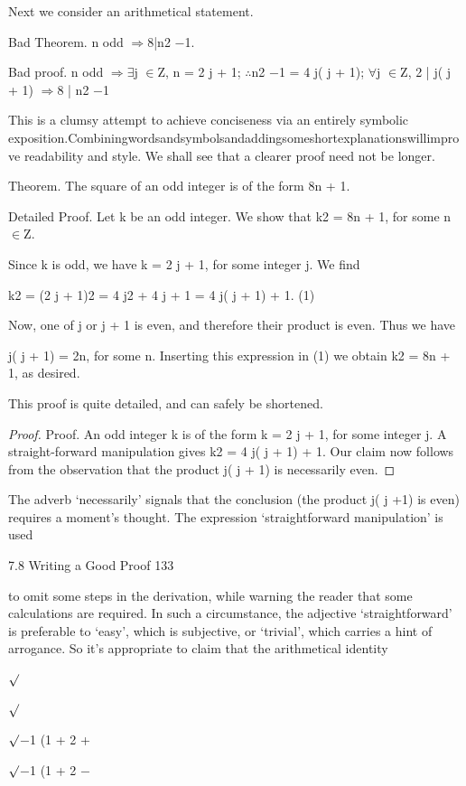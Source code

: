 \documentclass[11pt]{article}
\theoremstyle{plain}
\theoremstyle{definition}
\begin{document}
Next we consider an arithmetical statement.

Bad Theorem. n odd $\Rightarrow$8|n2 $-$1.

Bad proof. n odd $\Rightarrow$$\exists$j $\in$Z, n = 2 j + 1; $\therefore$n2 $-$1 = 4 j( j + 1); $\forall$j $\in$Z, 2 | j( j + 1) $\Rightarrow$8 | n2 $-$1 

This is a clumsy attempt to achieve conciseness via an entirely symbolic exposition.Combiningwordsandsymbolsandaddingsomeshortexplanationswillimprove readability and style. We shall see that a clearer proof need not be longer.

Theorem. The square of an odd integer is of the form 8n + 1.

Detailed Proof. Let k be an odd integer. We show that k2 = 8n + 1, for some n $\in$Z.

Since k is odd, we have k = 2 j + 1, for some integer j. We find

k2 = (2 j + 1)2 = 4 j2 + 4 j + 1 = 4 j( j + 1) + 1. (1)

Now, one of j or j + 1 is even, and therefore their product is even. Thus we have

j( j + 1) = 2n, for some n. Inserting this expression in (1) we obtain k2 = 8n + 1, as desired. 

This proof is quite detailed, and can safely be shortened.

\begin{proof}
Proof. An odd integer k is of the form k = 2 j + 1, for some integer j. A straight-forward manipulation gives k2 = 4 j( j + 1) + 1. Our claim now follows from the observation that the product j( j + 1) is necessarily even. 
\end{proof}

The adverb `necessarily' signals that the conclusion (the product j( j +1) is even) requires a moment's thought. The expression `straightforward manipulation' is used

7.8 Writing a Good Proof 133

to omit some steps in the derivation, while warning the reader that some calculations are required. In such a circumstance, the adjective `straightforward' is preferable to `easy', which is subjective, or `trivial', which carries a hint of arrogance. So it's appropriate to claim that the arithmetical identity

$\surd$

$\surd$

$\surd$$-$1 (1 + 2 +

$\surd$$-$1 (1 + 2 $-$
\end{document}
